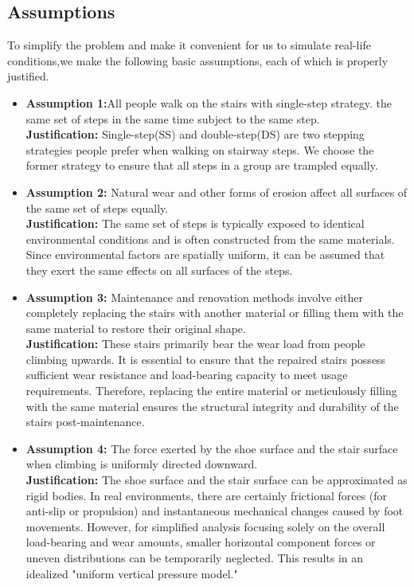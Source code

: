 \documentclass[12pt]{article}  %
\numberwithin{equation}{section} %
\begin{document}
\subsection{Assumptions}
To simplify the problem and make it convenient for us to simulate real-life conditions,we make the following basic assumptions, each of which is properly justified.
\begin{itemize}
	\setlength{\parsep}{0ex} %
	\setlength{\topsep}{2ex} %
	\setlength{\itemsep}{1ex} %
	\item \textbf{Assumption 1:}All people walk on the stairs with single-step strategy. the same set of steps in the same time subject to the same step.\\
    \textbf{Justification:} Single-step(SS) and double-step(DS) are two stepping strategies people prefer when walking on stairway steps\cite{1}. We choose the former strategy to ensure that all steps in a group are trampled equally.
    \vspace{1em}
    \item \textbf{Assumption 2:}
    Natural wear and other forms of erosion affect all surfaces of the same set of steps equally.
    \\
    \textbf{Justification:}
    The same set of steps is typically exposed to identical environmental conditions and is often constructed from the same materials. Since environmental factors are spatially uniform, it can be assumed that they exert the same effects on all surfaces of the steps.
    \vspace{1em}

    \item \textbf{Assumption 3:}
    Maintenance and renovation methods involve either completely replacing the stairs with another material or filling them with the same material to restore their original shape.
    \\
    \textbf{Justification:}
    These stairs primarily bear the wear load from people climbing upwards. It is essential to ensure that the repaired stairs possess sufficient wear resistance and load-bearing capacity to meet usage requirements. Therefore, replacing the entire material or meticulously filling with the same material ensures the structural integrity and durability of the stairs post-maintenance.
    \vspace{1em}

    \item \textbf{Assumption 4:}
    The force exerted by the shoe surface and the stair surface when climbing is uniformly directed downward.
    \\
    \textbf{Justification:}
    The shoe surface and the stair surface can be approximated as rigid bodies. In real environments, there are certainly frictional forces (for anti-slip or propulsion) and instantaneous mechanical changes caused by foot movements. However, for simplified analysis focusing solely on the overall load-bearing and wear amounts, smaller horizontal component forces or uneven distributions can be temporarily neglected. This results in an idealized "uniform vertical pressure model."


\end{itemize}
\end{document}
